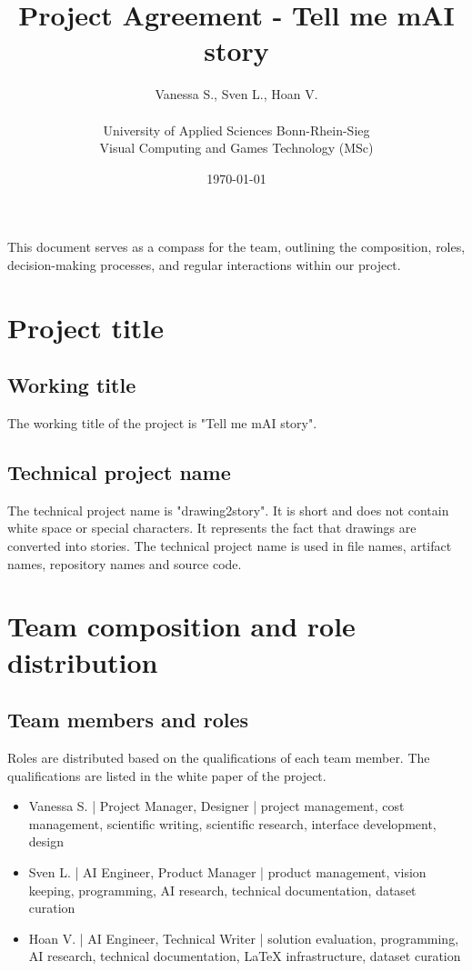 \documentclass{article}
\title{Project Agreement - Tell me mAI story}
\author{Vanessa S., Sven L., Hoan V. \\\\ University of Applied Sciences Bonn-Rhein-Sieg \\ Visual Computing and Games Technology (MSc)}
\date{\today}
\begin{document}
\maketitle

This document serves as a compass for the team, outlining the composition, roles, decision-making processes, and regular interactions within our project.

\section{Project title}
\subsection{Working title}
The working title of the project is "Tell me mAI story".
\subsection{Technical project name}
The technical project name is "drawing2story".
It is short and does not contain white space or special characters.
It represents the fact that drawings are converted into stories.
The technical project name is used in file names, artifact names, repository names and source code.

\section{Team composition and role distribution}
\subsection{Team members and roles}
Roles are distributed based on the qualifications of each team member.
The qualifications are listed in the white paper of the project.
\begin{itemize}
    \item Vanessa S. | Project Manager, Designer | project management, cost management, scientific writing, scientific research, interface development, design
    \item Sven L. | AI Engineer, Product Manager | product management, vision keeping, programming, AI research, technical documentation, dataset curation
    \item Hoan V. | AI Engineer, Technical Writer | solution evaluation, programming, AI research, technical documentation, LaTeX infrastructure, dataset curation
\end{itemize}
\end{document}
